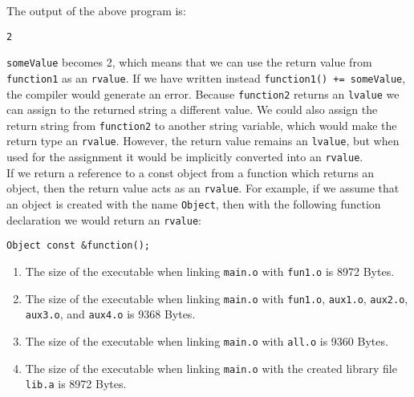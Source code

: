 \documentclass[a4paper]{article}
\newcounter{exerciseCount}
\newcommand{\exercise}[1]{\addtocounter{exerciseCount}{1} \noindent \medskip {\large \textsf{\textbf{Exercise \arabic{exerciseCount} #1}}} \par}
\begin{document}
The output of the above program is:

\begin{verbatim}
2
\end{verbatim}

\verb|someValue| becomes 2, which means that we can use the return value from \verb|function1| as an \verb|rvalue|. If we have written instead \verb|function1() += someValue|, the compiler would generate an error. Because \verb|function2| returns an \verb|lvalue| we can assign to the returned string a different value. We could also assign the return string from \verb|function2| to another string variable, which would make the return type an \verb|rvalue|. However, the return value remains an \verb|lvalue|, but when used for the assignment it would be implicitly converted into an \verb|rvalue|.\\

If we return a reference to a const object from a function which returns an object, then the return value acts as an \verb|rvalue|. For example, if we assume that an object is created with the name \verb|Object|, then with the following function declaration we would return an \verb|rvalue|:

\begin{verbatim}
Object const &function();
\end{verbatim}

\vspace{1em}

\exercise{} %







\begin{enumerate}
	\item The size of the executable when linking \verb|main.o| with \verb|fun1.o| is 8972 Bytes.
	\item The size of the executable when linking \verb|main.o| with \verb|fun1.o|, \verb|aux1.o|, \verb|aux2.o|, \verb|aux3.o|, and \verb|aux4.o| is 9368 Bytes.
	\item The size of the executable when linking \verb|main.o| with \verb|all.o| is 9360 Bytes.
	\item The size of the executable when linking \verb|main.o| with the created library file \verb|lib.a| is 8972 Bytes.
\end{enumerate}
\end{document}
